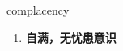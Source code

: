 
\begin{frame}
{\huge complacency}
\begin{center}
\begin{enumerate}\Large
  \item \textbf{自满，无忧患意识}
\end{enumerate}
\end{center}
\end{frame}
